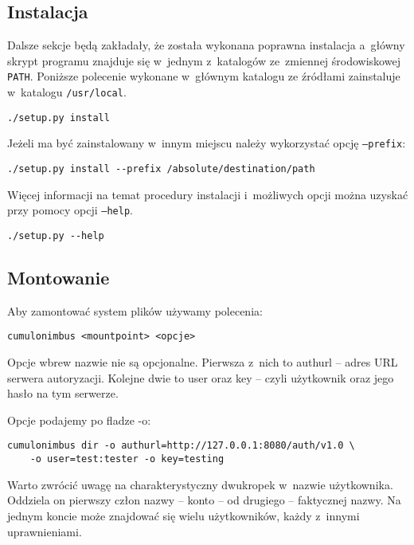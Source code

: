 \subsection{Instalacja}

Dalsze sekcje będą zakładały, że została wykonana poprawna instalacja a~główny
skrypt programu znajduje się w~jednym z~katalogów ze~zmiennej środowiskowej
\texttt{PATH}. Poniższe polecenie wykonane w~głównym katalogu ze źródłami
zainstaluje \cb{} w~katalogu \texttt{/usr/local}.

\begin{verbatim}
./setup.py install
\end{verbatim}

Jeżeli \cb{} ma być zainstalowany w~innym miejscu należy wykorzystać opcję
\texttt{--prefix}:

\begin{verbatim}
./setup.py install --prefix /absolute/destination/path
\end{verbatim}

Więcej informacji na temat procedury instalacji i~możliwych opcji można uzyskać
przy pomocy opcji \texttt{--help}.

\begin{verbatim}
./setup.py --help
\end{verbatim}

\subsection{Montowanie}

Aby zamontować system plików używamy polecenia:

\begin{verbatim}
cumulonimbus <mountpoint> <opcje>
\end{verbatim}

Opcje wbrew nazwie nie są opcjonalne. Pierwsza z~nich to authurl -- adres URL
serwera autoryzacji. Kolejne dwie to user oraz key -- czyli użytkownik oraz
jego hasło na tym serwerze.

Opcje podajemy po fladze -o:

\begin{verbatim}
cumulonimbus dir -o authurl=http://127.0.0.1:8080/auth/v1.0 \
    -o user=test:tester -o key=testing
\end{verbatim}

Warto zwrócić uwagę na charakterystyczny dwukropek w~nazwie użytkownika.
Oddziela on pierwszy człon nazwy -- konto -- od drugiego -- faktycznej nazwy.
Na jednym koncie może znajdować się wielu użytkowników, każdy z~innymi
uprawnieniami.

